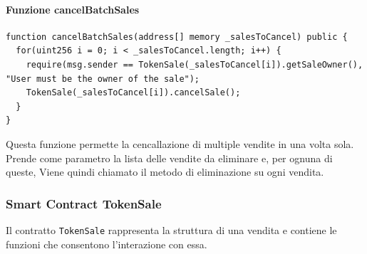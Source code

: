 \documentclass[a4paper]{article}
\begin{document}
        \paragraph{Funzione cancelBatchSales}
\begin{lstlisting}[style=ES6, title={Funzione cancelBatchSales()}]
function cancelBatchSales(address[] memory _salesToCancel) public {
  for(uint256 i = 0; i < _salesToCancel.length; i++) {
    require(msg.sender == TokenSale(_salesToCancel[i]).getSaleOwner(), "User must be the owner of the sale");
    TokenSale(_salesToCancel[i]).cancelSale();
  }
}\end{lstlisting}
        Questa funzione permette la cencallazione di multiple vendite in una volta sola. Prende come parametro la lista delle vendite da eliminare e, per ognuna di queste,
        Viene quindi chiamato il metodo di eliminazione su ogni vendita.
        \subsubsection{Smart Contract TokenSale}
        Il contratto \verb|TokenSale| rappresenta la struttura di una vendita e contiene le funzioni che consentono l'interazione con essa.
\end{document}
